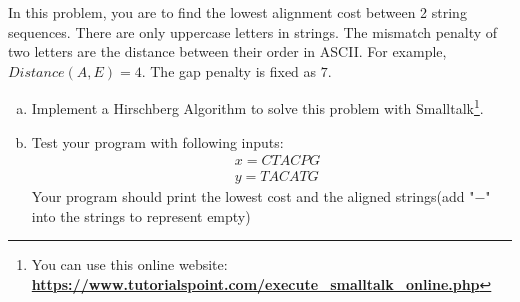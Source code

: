 \documentclass{article}
\begin{document}
In this problem, you are to find the lowest alignment cost between 2 string sequences. There are only uppercase letters in strings. The mismatch penalty of two letters are the distance between their order in ASCII. For example, $Distance(A, E) = 4$. The gap penalty is fixed as $7$. 
\begin{enumerate}[a)]
\item Implement a Hirschberg Algorithm to solve this problem with Smalltalk\footnote{You can use this online website: \href{https://www.tutorialspoint.com/execute_smalltalk_online.php}{\textbf{https://www.tutorialspoint.com/execute\_smalltalk\_online.php}}}.

\item Test your program with following inputs:
\begin{align*}
    &x=CTACPG\\
    &y=TACATG
\end{align*}
Your program should print the lowest cost and the aligned strings(add "$-$" into the strings to represent empty)
\end{enumerate}

\vspace{0.8em}
\end{document}
